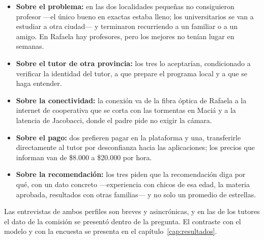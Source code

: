 \begin{itemize}
    \item \textbf{Sobre el problema:} en las dos localidades pequeñas no
          consiguieron profesor ---el único bueno en exactas estaba lleno;
          los universitarios se van a estudiar a otra ciudad--- y
          terminaron recurriendo a un familiar o a un amigo. En Rafaela hay
          profesores, pero los mejores no tenían lugar en semanas.
    \item \textbf{Sobre el tutor de otra provincia:} los tres lo
          aceptarían, condicionado a verificar la identidad del tutor, a
          que prepare el programa local y a que se haga entender.
    \item \textbf{Sobre la conectividad:} la conexión va de la fibra
          óptica de Rafaela a la internet de cooperativa que se corta con
          las tormentas en Maciá y a la latencia de Jacobacci, donde el
          padre pide no exigir la cámara.
    \item \textbf{Sobre el pago:} dos prefieren pagar en la plataforma y
          una, transferirle directamente al tutor por desconfianza hacia
          las aplicaciones; los precios que informan van de \$8.000 a
          \$20.000 por hora.
    \item \textbf{Sobre la recomendación:} los tres piden que la
          recomendación diga por qué, con un dato concreto ---experiencia
          con chicos de esa edad, la materia aprobada, resultados con otras
          familias--- y no solo un promedio de estrellas.
\end{itemize}

Las entrevistas de ambos perfiles son breves y asincrónicas, y en las de
los tutores el dato de la comisión se presentó dentro de la pregunta. El
contraste con el modelo y con la encuesta se presenta en el
capítulo~\ref{cap:resultados}.
